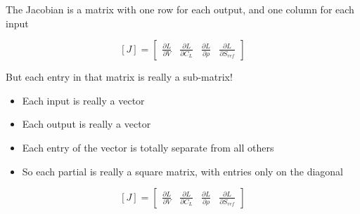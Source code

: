 \documentclass[aspectratio=169, usenames,dvipsnames, 14pt]{beamer}
\begin{document}
\begin{frame}{The Jacobian is a matrix with one row for each output, and one column for each input}

	$$
	[J] = 
	\begin{bmatrix}
		\frac{\partial L}{\partial V} & \frac{\partial L}{\partial C_L} & \frac{\partial L}{\partial \rho} & \frac{\partial L}{\partial S_{ref}}
	\end{bmatrix}
	$$

\end{frame}

\begin{frame}{But each entry in that matrix is really a sub-matrix!}

	\begin{itemize}
		\item Each input is really a vector
		\item Each output is really a vector
		\item Each entry of the vector is totally separate from all others
		\item So each partial is really a square matrix, with entries only on the diagonal
	\end{itemize}
	$$
	[J] = 
	\begin{bmatrix}
		\frac{\partial L}{\partial V} & \frac{\partial L}{\partial C_L} & \frac{\partial L}{\partial \rho} & \frac{\partial L}{\partial S_{ref}}
	\end{bmatrix}
	$$
	
\end{frame}
\end{document}
